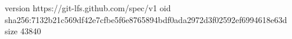 version https://git-lfs.github.com/spec/v1
oid sha256:7132b21c569df42e7cfbe5f6e8765894bdf0ada2972d3f02592ef6994618e63d
size 43840
